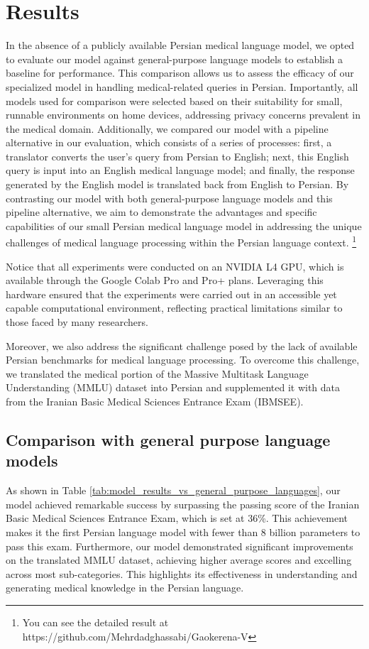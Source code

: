 \documentclass[conference]{IEEEtran}
\begin{document}
	\section{Results}
	In the absence of a publicly available Persian medical language model, we opted to evaluate our model against general-purpose language models to establish a baseline for performance. This comparison allows us to assess the efficacy of our specialized model in handling medical-related queries in Persian. Importantly, all models used for comparison were selected based on their suitability for small, runnable environments on home devices, addressing privacy concerns prevalent in the medical domain. Additionally, we compared our model with a pipeline alternative in our evaluation, which consists of a series of processes: first, a translator converts the user’s query from Persian to English; next, this English query is input into an English medical language model; and finally, the response generated by the English model is translated back from English to Persian. By contrasting our model with both general-purpose language models and this pipeline alternative, we aim to demonstrate the advantages and specific capabilities of our small Persian medical language model in addressing the unique challenges of medical language processing within the Persian language context. 
	\footnote{You can see the detailed result at https://github.com/Mehrdadghassabi/Gaokerena-V}

Notice that all experiments were conducted on an NVIDIA L4 GPU, which is available through the Google Colab Pro and Pro+ plans. Leveraging this hardware ensured that the experiments were carried out in an accessible yet capable computational environment, reflecting practical limitations similar to those faced by many researchers.
	
	Moreover, we also address the significant challenge posed by the lack of available Persian benchmarks for medical language processing. To overcome this challenge, we translated the medical portion of the Massive Multitask Language Understanding (MMLU) dataset 
	\cite{b32} 
	into Persian and supplemented it with data from the Iranian Basic Medical Sciences Entrance Exam (IBMSEE).
	
	
\subsection{Comparison with general purpose language models}
As shown in Table \ref{tab:model_results_vs_general_purpose_languages}, our model achieved remarkable success by surpassing the passing score of the Iranian Basic Medical Sciences Entrance Exam, which is set at 36\%. This achievement makes it the first Persian language model with fewer than 8 billion parameters to pass this exam. Furthermore, our model demonstrated significant improvements on the translated MMLU dataset, achieving higher average scores and excelling across most sub-categories. This highlights its effectiveness in understanding and generating medical knowledge in the Persian language.
\end{document}
